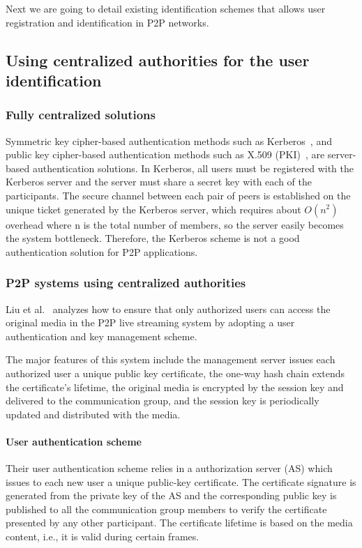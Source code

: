 Next we are going to detail existing identification schemes that allows user
registration and identification in P2P networks.


\subsection{Using centralized authorities for the user identification}

\subsubsection{Fully centralized solutions}

Symmetric key cipher-based authentication methods
such as Kerberos~\cite{neuman1994kerberos}, and public key cipher-based
authentication methods such as X.509 (PKI)~\cite{solo2002internet}, are
server-based authentication solutions. In Kerberos, all
users must be registered with the Kerberos server and
the server must share a secret key with each of the participants. The secure channel between each pair of
peers is established on the unique ticket generated by
the Kerberos server, which requires about $O(n^2)$ overhead where n is the total number of members, so the
server easily becomes the system bottleneck. Therefore,
the Kerberos scheme is not a good authentication solution for P2P applications.

\subsubsection{P2P systems using centralized authorities}


Liu et al.~\cite{liu2009efficient} analyzes how to ensure that only
authorized users can access the original media in the P2P live 
streaming system by adopting a user authentication and key management scheme.

The major features of this system include the management server issues each authorized user a
unique public key certificate, the one-way hash chain extends the certificate’s lifetime, the original
media is encrypted by the session key and delivered to the communication group, and the session key is
periodically updated and distributed with the media.

\paragraph{User authentication scheme}
Their user authentication scheme relies in a
authorization server (AS) which issues to each new user a
unique public-key certificate.
The certificate signature is generated from the private
key of the AS and the corresponding public key is published to all the communication group members to verify the certificate presented by any other participant.
The certificate lifetime is based on the media content,
i.e., it is valid during certain frames. 

